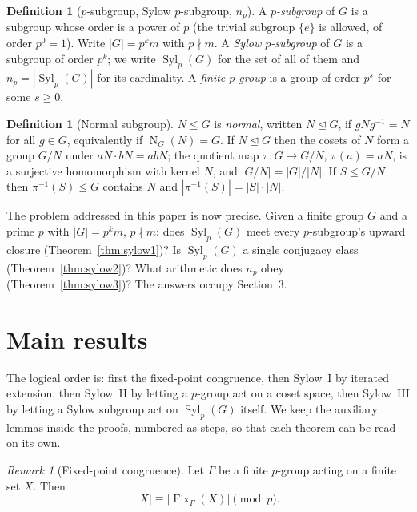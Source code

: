 \documentclass[11pt]{article}
\theoremstyle{definition}
\newtheorem{definition}[theorem]{Definition}
\theoremstyle{remark}
\newtheorem{remark}[theorem]{Remark}
\newcommand{\Syl}{\operatorname{Syl}}
\newcommand{\Fix}{\operatorname{Fix}}
\newcommand{\Norm}{\operatorname{N}}
\begin{document}
\begin{definition}[$p$-subgroup, Sylow $p$-subgroup, $n_p$]
A \emph{$p$-subgroup} of $G$ is a subgroup whose order is a power of $p$ (the trivial subgroup $
\{e\}$ is allowed, of order $p^0=1$). Write $|G|=p^{k}m$ with $p\nmid m$. A \emph{Sylow $p$-subgroup} of $G$ is a subgroup of order $p^{k}$; we write $\Syl_p(G)$ for the set of all of them and $n_p=|\Syl_p(G)|$ for its cardinality. A \emph{finite $p$-group} is a group of order $p^{s}$ for some $s\ge 0$.
\end{definition}

\begin{definition}[Normal subgroup]
$N\le G$ is \emph{normal}, written $N\trianglelefteq G$, if $gNg^{-1}=N$ for all $g\in G$, equivalently if $\Norm_G(N)=G$. If $N\trianglelefteq G$ then the cosets of $N$ form a group $G/N$ under $aN\cdot bN=abN$; the quotient map $\pi\colon G\to G/N$, $\pi(a)=aN$, is a surjective homomorphism with kernel $N$, and $|G/N|=|G|/|N|$. If $S\le G/N$ then $\pi^{-1}(S)\le G$ contains $N$ and $|\pi^{-1}(S)|=|S|\cdot|N|$.
\end{definition}

The problem addressed in this paper is now precise. Given a finite group $G$ and a prime $p$ with $|G|=p^{k}m$, $p\nmid m$: does $\Syl_p(G)$ meet every $p$-subgroup's upward closure (Theorem~\ref{thm:sylow1})? Is $\Syl_p(G)$ a single conjugacy class (Theorem~\ref{thm:sylow2})? What arithmetic does $n_p$ obey (Theorem~\ref{thm:sylow3})? The answers occupy Section~3.

\section{Main results}

The logical order is: first the fixed-point congruence, then Sylow~I by iterated extension, then Sylow~II by letting a $p$-group act on a coset space, then Sylow~III by letting a Sylow subgroup act on $\Syl_p(G)$ itself. We keep the auxiliary lemmas inside the proofs, numbered as steps, so that each theorem can be read on its own.

\begin{remark}[Fixed-point congruence]\label{lem:fix}
Let $\Gamma$ be a finite $p$-group acting on a finite set $X$. Then
\[
|X|\equiv |\Fix_\Gamma(X)| \pmod p .
\]
\end{remark}
\end{document}
